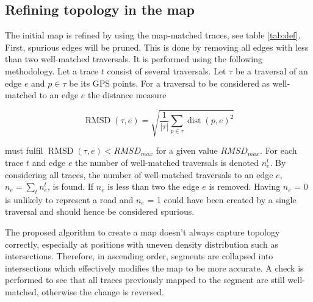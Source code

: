 \subsection{Refining topology in the map}

The initial map is refined by using the map-matched traces, see table \ref{tab:def}. First, spurious edges will be pruned. This is done by removing all edges with less than two well-matched traversals. It is performed using the following methodology. Let a trace $t$ consist of several traversals. Let $\tau$ be a traversal of an edge $e$ and $p \in \tau$ be its GPS points. For a traversal to be considered as well-matched to an edge $e$ the distance measure


\begin{equation}
    \operatorname{RMSD}(\tau, e) = \sqrt{\frac{1}{|\tau|}\sum_{p \in \tau}{\operatorname{dist}(p, e)^2}}
\end{equation}


must fulfil $\operatorname{RMSD}(\tau, e) < {RMSD}_{max}$ for a given value $RMSD_{max}$. For each trace $t$ and edge $e$ the number of well-matched traversals is denoted $n_e^t$. By considering all traces, the number of well-matched traversals to an edge $e$, $n_e = \sum_t{n_e^t}$, is found. If $n_e$ is less than two the edge $e$ is removed. Having $n_e$ = 0 is unlikely to represent a road and $n_e$ = 1 could have been created by a single traversal and should hence be considered spurious. %

The proposed algorithm to create a map doesn't always capture topology correctly, especially at positions with uneven density distribution such as intersections. Therefore, in ascending order, segments are collapsed into intersections which effectively modifies the map to be more accurate. A check is performed to see that all traces previously mapped to the segment are still well-matched, otherwise the change is reversed.

